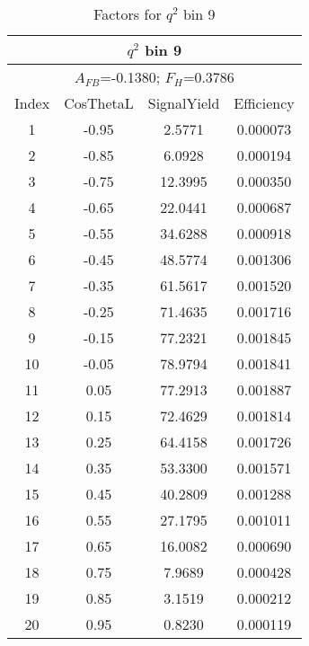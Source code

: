 \begin{table*}[htbH]
  \begin{center}
  \caption{Factors for $q^2$ bin 9 
  \label{tab:factors_bin9}}
  \small
  \begin{tabular}{|c||c|c|c|}
    \hline
    \multicolumn{4}{|c|}{$q^2$ bin 9} \\ 
    \hline
    \multicolumn{4}{|c|}{$A_{FB}$=-0.1380;   $F_{H}$=0.3786} \\ 
    \hline
    Index & CosThetaL & SignalYield & Efficiency \\ 
    \hline
    1 & -0.95 & 2.5771 & 0.000073 \\ 
    2 & -0.85 & 6.0928 & 0.000194 \\ 
    3 & -0.75 & 12.3995 & 0.000350 \\ 
    4 & -0.65 & 22.0441 & 0.000687 \\ 
    5 & -0.55 & 34.6288 & 0.000918 \\ 
    6 & -0.45 & 48.5774 & 0.001306 \\ 
    7 & -0.35 & 61.5617 & 0.001520 \\ 
    8 & -0.25 & 71.4635 & 0.001716 \\ 
    9 & -0.15 & 77.2321 & 0.001845 \\ 
    10 & -0.05 & 78.9794 & 0.001841 \\ 
    11 & 0.05 & 77.2913 & 0.001887 \\ 
    12 & 0.15 & 72.4629 & 0.001814 \\ 
    13 & 0.25 & 64.4158 & 0.001726 \\ 
    14 & 0.35 & 53.3300 & 0.001571 \\ 
    15 & 0.45 & 40.2809 & 0.001288 \\ 
    16 & 0.55 & 27.1795 & 0.001011 \\ 
    17 & 0.65 & 16.0082 & 0.000690 \\ 
    18 & 0.75 & 7.9689 & 0.000428 \\ 
    19 & 0.85 & 3.1519 & 0.000212 \\ 
    20 & 0.95 & 0.8230 & 0.000119 \\ 
    \hline
  \end{tabular}
  \end{center}
\end{table*}


